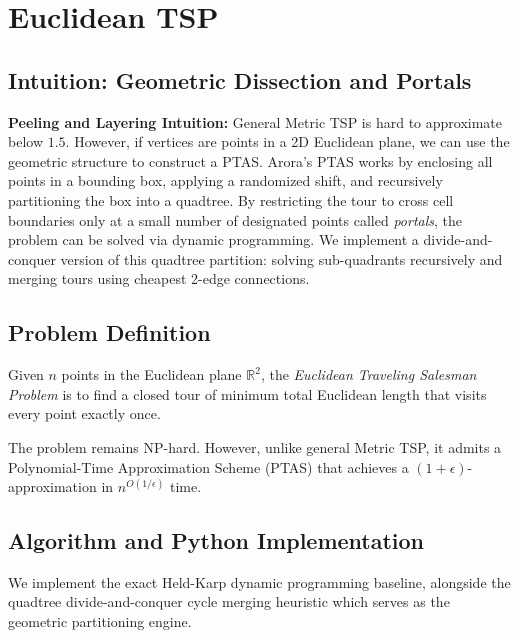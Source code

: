 \documentclass[11pt,oneside]{book}
\begin{document}
\chapter{Euclidean TSP}
\label{ch:euclidean_tsp}

\section{Intuition: Geometric Dissection and Portals}

\begin{intuitionbox}
\textbf{Peeling and Layering Intuition:} General Metric TSP is hard to approximate below $1.5$. However, if vertices are points in a 2D Euclidean plane, we can use the geometric structure to construct a PTAS. Arora's PTAS works by enclosing all points in a bounding box, applying a randomized shift, and recursively partitioning the box into a quadtree. By restricting the tour to cross cell boundaries only at a small number of designated points called \emph{portals}, the problem can be solved via dynamic programming. We implement a divide-and-conquer version of this quadtree partition: solving sub-quadrants recursively and merging tours using cheapest 2-edge connections.
\end{intuitionbox}

\section{Problem Definition}
Given $n$ points in the Euclidean plane $\mathbb{R}^2$, the \emph{Euclidean Traveling Salesman Problem} is to find a closed tour of minimum total Euclidean length that visits every point exactly once.

The problem remains NP-hard. However, unlike general Metric TSP, it admits a Polynomial-Time Approximation Scheme (PTAS) that achieves a $(1 + \epsilon)$-approximation in $n^{O(1/\epsilon)}$ time.

\section{Algorithm and Python Implementation}
We implement the exact Held-Karp dynamic programming baseline, alongside the quadtree divide-and-conquer cycle merging heuristic which serves as the geometric partitioning engine.
\end{document}
